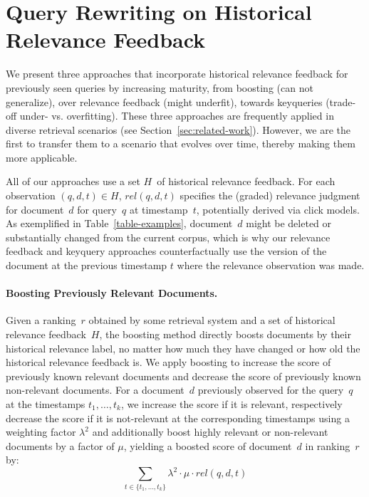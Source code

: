 \section{Query Rewriting on Historical Relevance Feedback}

We present three approaches that incorporate historical relevance feedback for previously seen queries by increasing maturity, from \Ni boosting (can not generalize), over \Nii relevance feedback (might underfit), towards \Niii keyqueries (trade-off under- vs. overfitting). These three approaches are frequently applied in diverse retrieval scenarios (see Section~\ref{sec:related-work}). However, we are the first to transfer them to a scenario that evolves over time, thereby making them more applicable.

All of our approaches use a set $H$~of historical relevance feedback. For each observation $(q, d, t) \in H$, $rel(q, d, t)$ specifies the (graded) relevance judgment for document~$d$ for query~$q$ at timestamp~$t$, potentially derived via click models. As exemplified in Table~\ref{table-examples}, document~$d$ might be deleted or substantially changed from the current corpus, which is why our relevance feedback and keyquery approaches counterfactually use the version of the document at the previous timestamp $t$ where the relevance observation was made.

\paragraph{Boosting Previously Relevant Documents.} Given a ranking~$r$ obtained by some retrieval system and a set of historical relevance feedback~$H$, the boosting method directly boosts documents by their historical relevance label, no matter how much they have changed or how old the historical relevance feedback is. We apply boosting to increase the score of previously known relevant documents and decrease the score of previously known non-relevant documents. For a document~$d$ previously observed for the query~$q$ at the timestamps $t_{1}, \ldots, t_{k}$, we increase the score if it is relevant, respectively decrease the score if it is not-relevant at the corresponding timestamps using a weighting factor $\lambda^2$ and additionally boost highly relevant or non-relevant documents by a factor of $\mu$, yielding a boosted score of document~$d$ in ranking~$r$ by:
\begin{equation}
\sum\limits_{t \in \{t_{1}, \ldots, t_{k}\}} \lambda^2 \cdot \mu \cdot rel(q,d,t)
\end{equation}

